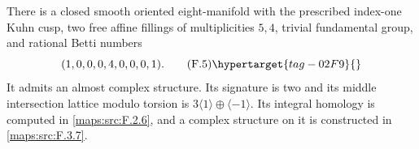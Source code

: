 \begin{theorem}\hypertarget{tag-02NW}{}\label{maps:src:F.2.5}


There is a closed smooth oriented eight-manifold with the prescribed
index-one Kuhn cusp, two free affine fillings of multiplicities $5,4$,
trivial fundamental group, and rational Betti numbers
\[
 (1,0,0,0,4,0,0,0,1). \tag{F.5}\hypertarget{tag-02F9}{}\label{maps:eq:F.5}
\]
It admits an almost complex structure.  Its signature is two and
its middle intersection lattice modulo torsion is
$3\langle1\rangle\oplus\langle-1\rangle$.
Its integral homology is computed in \cref{maps:src:F.2.6}, and a complex structure on it is constructed in \cref{maps:src:F.3.7}.

\end{theorem}


